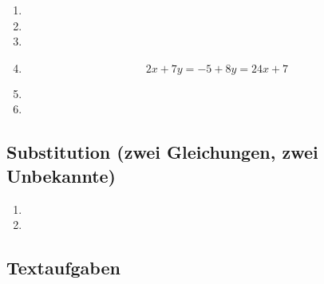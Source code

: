 \begin{multicols}{2}
  \begin{enumerate}
  \item
    

  \item

  \item

\item
  $$2x+7y = -5+8y = 24x +7$$
\item

\item
  
  \end{enumerate}
\end{multicols}


  \subsection{Substitution (zwei Gleichungen, zwei Unbekannte)}

\begin{multicols}{2}
  \begin{enumerate}
  \item

  \item
  \end{enumerate}
\end{multicols}

  \subsection{Textaufgaben}

